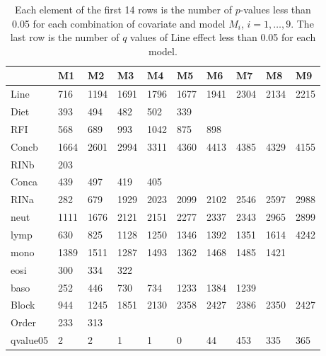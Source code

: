 \documentclass[12pt, letter]{article}\usepackage[]{graphicx}\usepackage[]{color}
\begin{document}
\begin{table}
\centering
\begin{tabular}{|l|l|l|l|l|l|l|l|l|l|}
  \hline
 & M1 & M2 & M3 & M4 & M5 & M6 & M7 & M8 & M9 \\ 
  \hline
Line & 716 & 1194 & 1691 & 1796 & 1677 & 1941 & 2304 & 2134 & 2215 \\ 
   \hline
Diet & 393 & 494 & 482 & 502 & 339 &  &  &  &  \\ 
   \hline
RFI & 568 & 689 & 993 & 1042 & 875 & 898 &  &  &  \\ 
   \hline
Concb & 1664 & 2601 & 2994 & 3311 & 4360 & 4413 & 4385 & 4329 & 4155 \\ 
   \hline
RINb & 203 &  &  &  &  &  &  &  &  \\ 
   \hline
Conca & 439 & 497 & 419 & 405 &  &  &  &  &  \\ 
   \hline
RINa & 282 & 679 & 1929 & 2023 & 2099 & 2102 & 2546 & 2597 & 2988 \\ 
   \hline
neut & 1111 & 1676 & 2121 & 2151 & 2277 & 2337 & 2343 & 2965 & 2899 \\ 
   \hline
lymp & 630 & 825 & 1128 & 1250 & 1346 & 1392 & 1351 & 1614 & 4242 \\ 
   \hline
mono & 1389 & 1511 & 1287 & 1493 & 1362 & 1468 & 1485 & 1421 &  \\ 
   \hline
eosi & 300 & 334 & 322 &  &  &  &  &  &  \\ 
   \hline
baso & 252 & 446 & 730 & 734 & 1233 & 1384 & 1239 &  &  \\ 
   \hline
Block & 944 & 1245 & 1851 & 2130 & 2358 & 2427 & 2386 & 2350 & 2427 \\ 
   \hline
Order & 233 & 313 &  &  &  &  &  &  &  \\ 
   \hline
qvalue05 & 2 & 2 & 1 & 1 & 0 & 44 & 453 & 335 & 365 \\ 
   \hline
\end{tabular}
\caption{Each element of the first 14 rows is the number of $p$-values less than 0.05 for each combination of covariate and model $M_i$, $i = 1, \dots, 9$. The last row is the number of $q$ values  of Line effect less than 0.05 for each model. } 
\label{tablepvalue}
\end{table}
\end{document}
